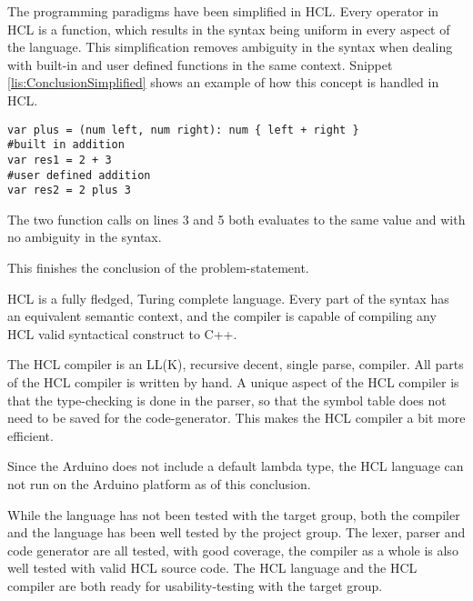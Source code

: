 The programming paradigms have been simplified in HCL.
Every operator in HCL is a function, which results in the syntax being uniform in every aspect of the language.
This simplification removes ambiguity in the syntax when dealing with built-in and user defined functions in the same context.
Snippet \ref{lis:ConclusionSimplified} shows an example of how this concept is handled in HCL.

\begin{lstlisting}[language=hcl,label=lis:ConclusionSimplified,caption=Built-in and user defined function]
var plus = (num left, num right): num { left + right }
#built in addition
var res1 = 2 + 3
#user defined addition
var res2 = 2 plus 3 
\end{lstlisting}

The two function calls on lines 3 and 5 both evaluates to the same value and with no ambiguity in the syntax.

This finishes the conclusion of the problem-statement.

HCL is a fully fledged, Turing complete language.
Every part of the syntax has an equivalent semantic context, and the compiler is capable of compiling any HCL valid syntactical construct to C++.

The HCL compiler is an LL(K), recursive decent, single parse, compiler.
All parts of the HCL compiler is written by hand.
A unique aspect of the HCL compiler is that the type-checking is done in the parser, so that the symbol table does not need to be saved for the code-generator.
This makes the HCL compiler a bit more efficient.

Since the Arduino does not include a default lambda type, the HCL language can not run on the Arduino platform as of this conclusion.

While the language has not been tested with the target group, both the compiler and the language has been well tested by the project group.
The lexer, parser and code generator are all tested, with good coverage, the compiler as a whole is also well tested with valid HCL source code.
The HCL language and the HCL compiler are both ready for usability-testing with the target group.





